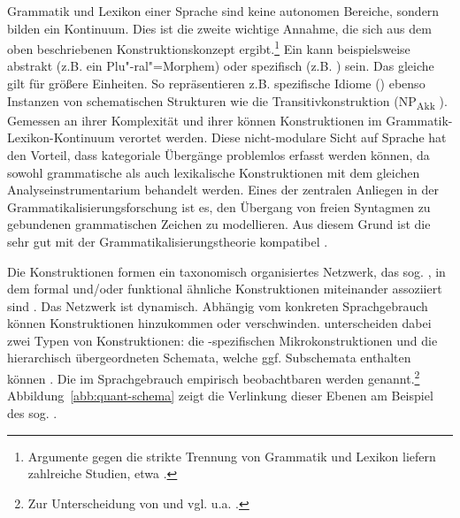 
Grammatik und Lexikon einer Sprache sind keine autonomen Bereiche, sondern bilden ein Kontinuum. Dies ist die zweite wichtige Annahme, die sich aus dem oben beschriebenen  Konstruktionskonzept  ergibt.\footnote{Argumente gegen die strikte Trennung von Grammatik und Lexikon liefern zahlreiche Studien, etwa \textcite{Goldberg2006}.} Ein  kann beispielsweise abstrakt  (z.B. ein Plu"-ral"=Morphem) oder spezifisch (z.B. ) sein. Das gleiche gilt für größere Einheiten. So repräsentieren z.B. spezifische Idiome () ebenso Instanzen von schematischen Strukturen  wie die  Transitivkonstruktion    (NP\textsubscript{Akk} ). Gemessen an ihrer Komplexität und ihrer  können Konstruktionen  im Grammatik-Lexikon-Kontinuum verortet werden. Diese nicht-modulare Sicht auf Sprache hat den Vorteil, dass kategoriale Übergänge problemlos erfasst werden können, da sowohl grammatische als auch lexikalische Konstruktionen  mit dem gleichen Analyseinstrumentarium behandelt werden. Eines der zentralen Anliegen in der Grammatikalisierungsforschung  ist es, den Übergang von freien Syntagmen zu gebundenen grammatischen Zeichen zu modellieren. Aus diesem Grund ist die  sehr gut mit der Grammatikalisierungstheorie kompatibel \parencite[zur weiterführenden Diskussion s. ][85]{Diewald2008}. 


Die Konstruktionen formen ein taxonomisch organisiertes Netzwerk, das sog.  \parencite[95]{Ziem2013}, in dem formal und/oder funktional ähnliche Konstruktionen miteinander assoziiert sind \parencites()()[]{Langacker1987}[262--265]{Croft2004}[]{Bybee2010}. Das Netzwerk ist dynamisch. Abhängig vom konkreten Sprachgebrauch können  Konstruktionen  hinzukommen oder verschwinden. \textcite[17]{Traugott2013} unterscheiden dabei zwei Typen von Konstruktionen: die -spezifischen Mikrokonstruktionen  und die hierarchisch übergeordneten Schemata,  welche ggf. Subschemata enthalten können \parencite[s. auch][]{Traugott2015}. Die im Sprachgebrauch empirisch beobachtbaren  werden  genannt.\footnote{Zur Unterscheidung von  und  vgl. u.a. \textcite[][423]{Fried2013}.} Abbildung~\ref{abb:quant-schema} zeigt die Verlinkung dieser Ebenen am Beispiel des sog.  \parencite[aus][17]{Traugott2013}. 

